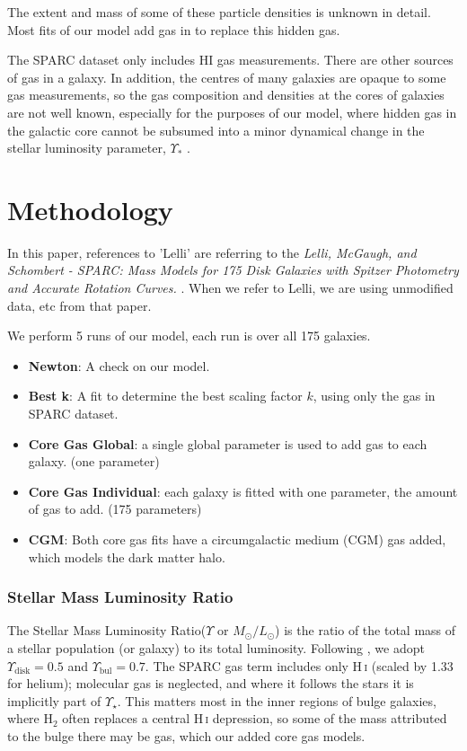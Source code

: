 \documentclass[fleqn,usenatbib]{mnras}
\begin{document}
The extent and mass of some of these particle densities is unknown in detail. Most fits of our model add gas in to replace this hidden gas.
 
The SPARC dataset only includes HI gas measurements. There are other sources of gas in a galaxy. In addition, the centres of many galaxies are opaque to some gas measurements\citep{saintongeColdInterstellarMedium2022}, so the gas composition and densities at the cores of galaxies are not well known, especially for the purposes of our model, where hidden gas in the galactic core cannot be subsumed into a minor dynamical change in the stellar luminosity parameter, $\Upsilon_{*}$ \citep{lelliSPARCMassModels2016}.

\section{Methodology} \label{sec:meth}
In this paper, references to 'Lelli' are referring to the \textit{Lelli, McGaugh, and Schombert - SPARC: Mass Models for 175 Disk Galaxies with Spitzer Photometry and Accurate Rotation Curves.} \citep{lelliSPARCMassModels2016}. When we refer to Lelli, we are using unmodified data, etc from that paper. 

We perform 5 runs of our model, each run is over all 175 galaxies.

\begin{itemize}
	\item \label{Newton}\textbf{Newton}: A check on our model. 	
	\item \label{bestk}\textbf{Best k}: A fit to determine the best scaling factor $k$, using only the gas in SPARC dataset.
	\item \label{coregasglobal}\textbf{Core Gas Global}: a single global parameter is used to add  gas to each galaxy. (one parameter)
	\item \label{coregasindividual}\textbf{Core Gas Individual}: each galaxy is fitted with one parameter, the amount of gas to add. (175 parameters)
	\item \label{cgmrun}\textbf{CGM}: Both core gas fits have a circumgalactic medium (CGM) gas added, which models the dark matter halo.
\end{itemize}

\subsubsection{Stellar Mass Luminosity Ratio}
The Stellar Mass Luminosity Ratio($\Upsilon$ or $M_\odot/L_\odot$) is the ratio of the total mass of a stellar population (or galaxy) to its total luminosity.
Following \citet{lelliSPARCMassModels2016}, we adopt $\Upsilon_\mathrm{disk}=0.5$ and $\Upsilon_\mathrm{bul}=0.7$. The SPARC gas term includes only H\,\textsc{i} (scaled by 1.33 for helium); molecular gas is neglected, and where it follows the stars it is implicitly part of $\Upsilon_\star$. This matters most in the inner regions of bulge galaxies, where H$_2$ often replaces a central H\,\textsc{i} depression, so some of the mass attributed to the bulge there may be gas, which our added core gas models. 
\end{document}
